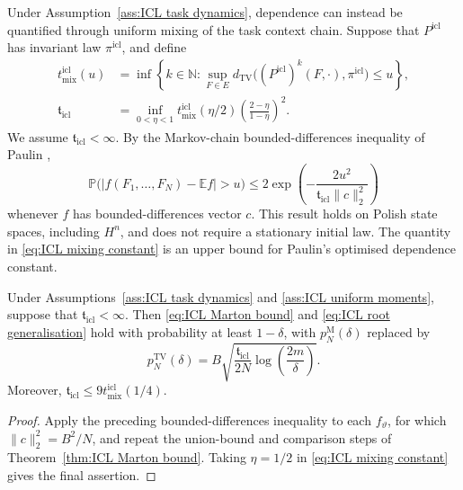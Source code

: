 Under Assumption~\ref{ass:ICL task dynamics}, dependence can instead be quantified through uniform mixing of the task context chain. Suppose that \(P^{\mathrm{icl}}\) has invariant law \(\pi^{\mathrm{icl}}\), and define
\begin{align}
t_{\mathrm{mix}}^{\mathrm{icl}}(u)
&=\inf\left\{k\in\mathbb N:
\sup_{F\in E}d_{\mathrm{TV}}\bigl((P^{\mathrm{icl}})^k(F,\cdot),\pi^{\mathrm{icl}}\bigr)\leqslant u\right\},
\label{eq:ICL mixing time}\\
\mathfrak t_{\mathrm{icl}}
&=\inf_{0<\eta<1}t_{\mathrm{mix}}^{\mathrm{icl}}(\eta/2)
\left(\frac{2-\eta}{1-\eta}\right)^2.
\label{eq:ICL mixing constant}
\end{align}
We assume \(\mathfrak t_{\mathrm{icl}}<\infty\). By the Markov-chain bounded-differences inequality of Paulin \cite[Corollary~2.11 and Remark~2.12, arXiv version]{Paulin2015},
\[
\mathbb P\bigl(|f(F_1,\ldots,F_N)-\mathbb Ef|>u\bigr)
\leqslant2\exp\left(-\frac{2u^2}{\mathfrak t_{\mathrm{icl}}\|c\|_2^2}\right)
\]
whenever \(f\) has bounded-differences vector \(c\). This result holds on Polish state spaces, including \(H^n\), and does not require a stationary initial law. The quantity in \eqref{eq:ICL mixing constant} is an upper bound for Paulin's optimised dependence constant.

\begin{corollary}
\label{cor:ICL TV bound}
Under Assumptions~\ref{ass:ICL task dynamics} and \ref{ass:ICL uniform moments}, suppose that \(\mathfrak t_{\mathrm{icl}}<\infty\). Then \eqref{eq:ICL Marton bound} and \eqref{eq:ICL root generalisation} hold with probability at least \(1-\delta\), with \(p_N^{\mathrm M}(\delta)\) replaced by
\begin{equation}
\label{eq:ICL TV penalty}
p_N^{\mathrm{TV}}(\delta)
=B\sqrt{\frac{\mathfrak t_{\mathrm{icl}}}{2N}
\log\left(\frac{2m}{\delta}\right)}.
\end{equation}
Moreover, \(\mathfrak t_{\mathrm{icl}}\leqslant9t_{\mathrm{mix}}^{\mathrm{icl}}(1/4)\).
\end{corollary}

\begin{proof}
Apply the preceding bounded-differences inequality to each \(f_\vartheta\), for which \(\|c\|_2^2=B^2/N\), and repeat the union-bound and comparison steps of Theorem~\ref{thm:ICL Marton bound}. Taking \(\eta=1/2\) in \eqref{eq:ICL mixing constant} gives the final assertion.
\end{proof}


